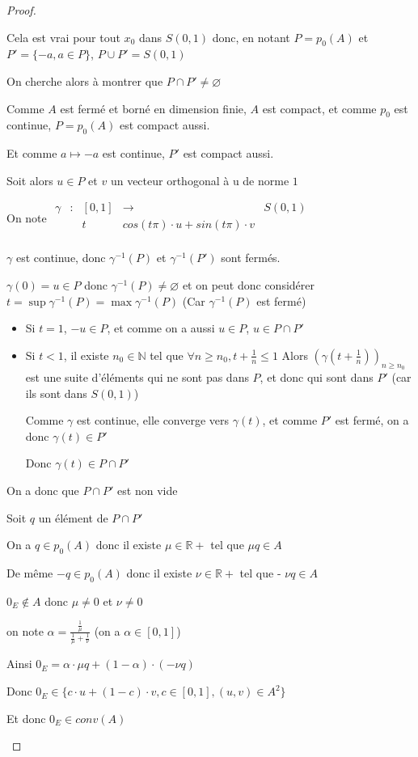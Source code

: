 \documentclass[a4paper]{article}
\begin{document}
\begin{proof}
\begin{itemize}
Cela est vrai pour tout $x_{0}$ dans $S(0, 1)$ donc, en notant $P = p_{0}(A)$ et $P' = \{-a, a \in P \}$, $P \cup P' = S(0, 1)$

On cherche alors à montrer que $ P \cap P' \neq \varnothing$

Comme $A$ est fermé et borné en dimension finie, $A$ est compact, et comme $p_{0}$ est continue, $P = p_{0}(A)$ est compact aussi.

Et comme $a \mapsto -a$ est continue, $P'$ est compact aussi.

Soit alors $u \in P$ et $v$ un vecteur orthogonal à u de norme $1$

On note $\begin{array}{ccccc}
\gamma & : & [0, 1] & \to & S(0, 1) \\
 & & t & cos(t\pi) \cdot u + sin(t\pi) \cdot v \\
\end{array}$

$\gamma$ est continue, donc $\gamma^{-1}(P)$ et $\gamma^{-1}(P')$ sont fermés.

$\gamma(0) = u \in P$ donc $\gamma^{-1}(P) \neq \varnothing$ et on peut donc considérer $t = \sup \gamma^{-1}(P) = \max \gamma^{-1}(P)$ (Car $\gamma^{-1}(P)$ est fermé)

\begin{itemize}
\item Si $t = 1$, $-u \in P$, et comme on a aussi $u \in P$, $u \in P \cap P'$
\item Si $t < 1$, il existe $n_{0} \in \mathbb{N}$ tel que $\forall n \geqslant n_{0}, t + \frac{1}{n} \leqslant 1$
Alors $(\gamma(t + \frac{1}{n}))_{n \geqslant n_{0}}$ est une suite d'éléments qui ne sont pas dans $P$, et donc qui sont dans $P'$ (car ils sont dans $S(0, 1)$)


Comme $\gamma$ est continue, elle converge vers $\gamma(t)$, et comme $P'$ est fermé, on a donc $\gamma(t) \in P'$

Donc $\gamma(t) \in P \cap P'$
\end{itemize}

On a donc que $P \cap P'$ est non vide

Soit $q$ un élément de $P \cap P'$

On a $q \in p_{0}(A)$ donc il existe $\mu \in \mathbb{R}+$ tel que $\mu q \in A$

De même $-q \in p_{0}(A)$ donc il existe $\nu \in \mathbb{R}+$ tel que - $\nu q \in A$

$0_{E} \notin A$ donc $\mu \neq 0$ et $\nu \neq 0$

on note $\alpha = \frac{\frac{1}{\mu}}{\frac{1}{\mu} + \frac{1}{\nu}}$ (on a $\alpha \in [0, 1]$)

Ainsi $0_{E} = \alpha \cdot \mu q + (1 - \alpha) \cdot (- \nu  q)$

Donc $0_{E} \in \{c \cdot u + (1 - c) \cdot v, c \in [0, 1], (u, v) \in A^{2} \}$


Et donc $0_{E} \in conv(A)$
\end{itemize}
\end{proof}
\end{document}
